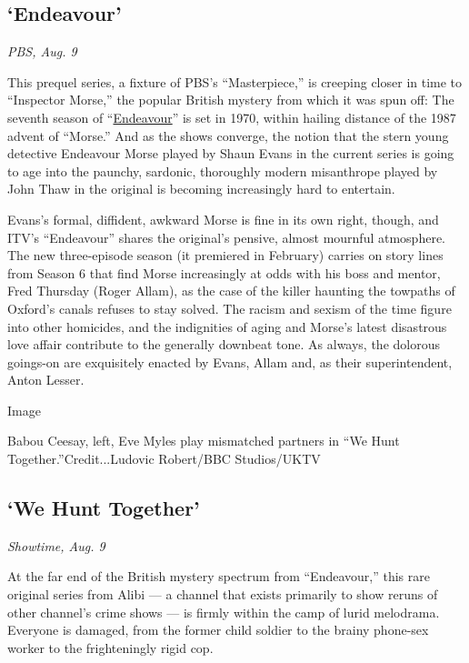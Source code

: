 \hypertarget{endeavour}{%
\subsection{`Endeavour'}\label{endeavour}}

\emph{PBS, Aug. 9}

This prequel series, a fixture of PBS's ``Masterpiece,'' is creeping
closer in time to ``Inspector Morse,'' the popular British mystery from
which it was spun off: The seventh season of
``\href{https://www.nytimes.com/2012/06/30/arts/television/inspector-morse-returns-in-endeavour-a-prequel.html?searchResultPosition=2}{Endeavour}''
is set in 1970, within hailing distance of the 1987 advent of ``Morse.''
And as the shows converge, the notion that the stern young detective
Endeavour Morse played by Shaun Evans in the current series is going to
age into the paunchy, sardonic, thoroughly modern misanthrope played by
John Thaw in the original is becoming increasingly hard to entertain.

Evans's formal, diffident, awkward Morse is fine in its own right,
though, and ITV's ``Endeavour'' shares the original's pensive, almost
mournful atmosphere. The new three-episode season (it premiered in
February) carries on story lines from Season 6 that find Morse
increasingly at odds with his boss and mentor, Fred Thursday (Roger
Allam), as the case of the killer haunting the towpaths of Oxford's
canals refuses to stay solved. The racism and sexism of the time figure
into other homicides, and the indignities of aging and Morse's latest
disastrous love affair contribute to the generally downbeat tone. As
always, the dolorous goings-on are exquisitely enacted by Evans, Allam
and, as their superintendent, Anton Lesser.

Image

Babou Ceesay, left, Eve Myles play mismatched partners in ``We Hunt
Together.''Credit...Ludovic Robert/BBC Studios/UKTV

\hypertarget{we-hunt-together}{%
\subsection{`We Hunt Together'}\label{we-hunt-together}}

\emph{Showtime, Aug. 9}

At the far end of the British mystery spectrum from ``Endeavour,'' this
rare original series from Alibi --- a channel that exists primarily to
show reruns of other channel's crime shows --- is firmly within the camp
of lurid melodrama. Everyone is damaged, from the former child soldier
to the brainy phone-sex worker to the frighteningly rigid cop.

